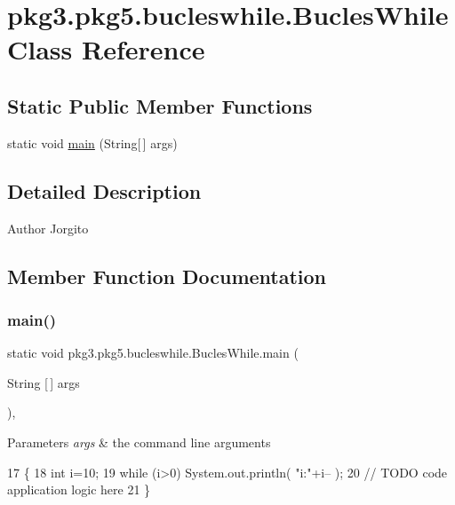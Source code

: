 \hypertarget{classpkg3_1_1pkg5_1_1bucleswhile_1_1_bucles_while}{}\section{pkg3.\+pkg5.\+bucleswhile.\+Bucles\+While Class Reference}
\label{classpkg3_1_1pkg5_1_1bucleswhile_1_1_bucles_while}
\subsection*{Static Public Member Functions}
\begin{DoxyCompactItemize}
\item 
static void \mbox{\hyperlink{classpkg3_1_1pkg5_1_1bucleswhile_1_1_bucles_while_a287f3d9c9b4814723b69bba75fd629ba}{main}} (String\mbox{[}$\,$\mbox{]} args)
\end{DoxyCompactItemize}


\subsection{Detailed Description}
\begin{DoxyAuthor}{Author}
Jorgito 
\end{DoxyAuthor}


\subsection{Member Function Documentation}
\mbox{\label{classpkg3_1_1pkg5_1_1bucleswhile_1_1_bucles_while_a287f3d9c9b4814723b69bba75fd629ba}} 
\subsubsection{\texorpdfstring{main()}{main()}}
{\footnotesize\ttfamily static void pkg3.\+pkg5.\+bucleswhile.\+Bucles\+While.\+main (\begin{DoxyParamCaption}\item[{String \mbox{[}$\,$\mbox{]}}]{args }\end{DoxyParamCaption})\hspace{0.3cm}{\ttfamily [inline]}, {\ttfamily [static]}}


\begin{DoxyParams}{Parameters}
{\em args} & the command line arguments \\
\hline
\end{DoxyParams}

\begin{DoxyCode}
17                                            \{
18         \textcolor{keywordtype}{int} i=10;
19             \textcolor{keywordflow}{while} (i>0) System.out.println( \textcolor{stringliteral}{"i:"}+i-- );
20         \textcolor{comment}{// TODO code application logic here}
21     \}
\end{DoxyCode}
